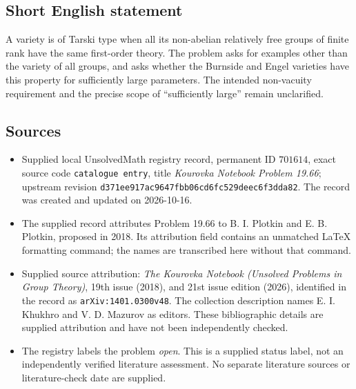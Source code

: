 \documentclass[11pt]{article}
\begin{document}
\subsection{Short English statement}
A variety is of Tarski type when all its non-abelian relatively free groups of finite rank have the same first-order theory. The problem asks for examples other than the variety of all groups, and asks whether the Burnside and Engel varieties have this property for sufficiently large parameters. The intended non-vacuity requirement and the precise scope of ``sufficiently large'' remain unclarified.
\subsection{Sources}
\begin{itemize}
\item Supplied local UnsolvedMath registry record, permanent ID \(701614\), exact source code \texttt{catalogue entry}, title \emph{Kourovka Notebook Problem 19.66}; upstream revision \texttt{d371ee917ac9647fbb06cd6fc529deec6f3dda82}. The record was created and updated on 2026-10-16.
\item The supplied record attributes Problem 19.66 to B. I. Plotkin and E. B. Plotkin, proposed in 2018. Its attribution field contains an unmatched LaTeX formatting command; the names are transcribed here without that command.
\item Supplied source attribution: \emph{The Kourovka Notebook (Unsolved Problems in Group Theory)}, 19th issue (2018), and 21st issue edition (2026), identified in the record as \texttt{arXiv:1401.0300v48}. The collection description names E. I. Khukhro and V. D. Mazurov as editors. These bibliographic details are supplied attribution and have not been independently checked.
\item The registry labels the problem \emph{open}. This is a supplied status label, not an independently verified literature assessment. No separate literature sources or literature-check date are supplied.
\end{itemize}
\end{document}
